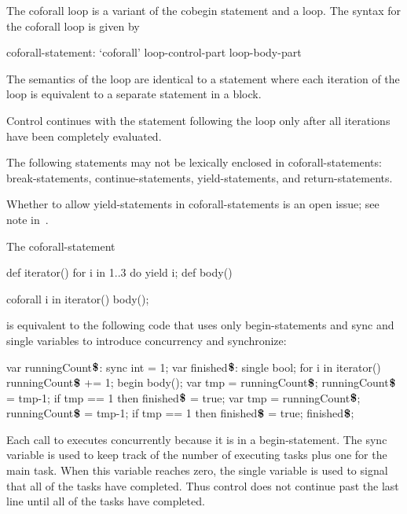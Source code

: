 The coforall loop is a variant of the cobegin statement and a loop.
The syntax for the coforall loop is given by
\begin{syntax}
coforall-statement:
  `coforall' loop-control-part loop-body-part
\end{syntax}

The semantics of the  loop are identical to
a  statement where each iteration of the 
loop is equivalent to a separate statement in a  block.

Control continues with the statement following the 
loop only after all iterations have been completely evaluated.

The following statements may not be lexically enclosed in
coforall-statements: break-statements, continue-statements,
yield-statements, and return-statements.

\begin{openissue}
Whether to allow yield-statements in coforall-statements is an open
issue; see note in~.
\end{openissue}

\begin{example}
The coforall-statement
\begin{chapelpre}
def iterator() { for i in 1..3 do yield i; }
def body() { }
\end{chapelpre}
\begin{chapel}
coforall i in iterator() {
  body();
}
\end{chapel}
is equivalent to the following code that uses only begin-statements
and sync and single variables to introduce concurrency and
synchronize:
\begin{chapel}
var runningCount$\mbox{{\bf \$}}$: sync int = 1;
var finished$\mbox{{\bf \$}}$: single bool;
for i in iterator() {
  runningCount$\mbox{{\bf \$}}$ += 1;
  begin {
    body();
    var tmp = runningCount$\mbox{{\bf \$}}$;
    runningCount$\mbox{{\bf \$}}$ = tmp-1;
    if tmp == 1 then finished$\mbox{{\bf \$}}$ = true;
  }
}
var tmp = runningCount$\mbox{{\bf \$}}$;
runningCount$\mbox{{\bf \$}}$ = tmp-1;
if tmp == 1 then finished$\mbox{{\bf \$}}$ = true;
finished$\mbox{{\bf \$}}$;
\end{chapel}
\begin{chapeloutput}
\end{chapeloutput}
Each call to  executes concurrently because it is in a
begin-statement.  The sync
variable  is used to keep track of
the number of executing tasks plus one for the main task.  When this
variable reaches zero, the single
variable  is used to signal that all
of the tasks have completed.  Thus control does not continue past the
last line until all of the tasks have completed.
\end{example}

